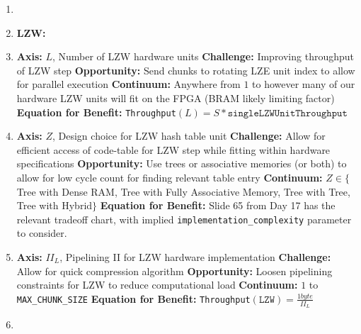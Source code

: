\documentclass{article}
\begin{document}
\begin{enumerate}
\item%


\item%


\textbf{LZW:}
\item%

\textbf{Axis:} $L$, Number of LZW hardware units
\newline
\textbf{Challenge:} Improving throughput of LZW step
\newline
\textbf{Opportunity:} Send chunks to rotating LZE unit index to allow for parallel execution
\newline
\textbf{Continuum:} Anywhere from $1$ to however many of our hardware LZW units will fit on the FPGA (BRAM likely limiting factor)
\newline
\textbf{Equation for Benefit:} \texttt{Throughput}$\left(L\right)=S*\texttt{singleLZWUnitThroughput}$

\item%

\textbf{Axis:} $Z$, Design choice for LZW hash table unit
\newline
\textbf{Challenge:} Allow for efficient access of code-table for LZW step while fitting within hardware specifications
\newline
\textbf{Opportunity:} Use trees or associative memories (or both) to allow for low cycle count for finding relevant table entry
\newline
\textbf{Continuum:} $Z\in\{$Tree with Dense RAM, Tree with Fully Associative Memory, Tree with Tree, Tree with Hybrid$\}$
\newline
\textbf{Equation for Benefit:} Slide 65 from Day 17 has the relevant tradeoff chart, with implied \texttt{implementation\_complexity} parameter to consider.

\item%

\textbf{Axis:} $II_L$, Pipelining II for LZW hardware implementation
\newline
\textbf{Challenge:} Allow for quick compression algorithm
\newline
\textbf{Opportunity:} Loosen pipelining constraints for LZW to reduce computational load
\newline
\textbf{Continuum:} $1$ to \texttt{MAX\_CHUNK\_SIZE}
\newline
\textbf{Equation for Benefit:} \texttt{Throughput}$\left(\texttt{LZW}\right)=\frac{1 byte}{II_L}$

\item%


\end{enumerate}
\end{document}
